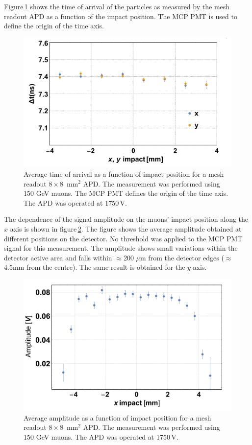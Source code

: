 \documentclass[review,number,sort&compress]{elsarticle}
\begin{document}
Figure\,\ref{fig:toa8x8impact} shows the time of arrival of the particles as measured by the mesh readout APD as a function of the impact position.
The MCP PMT is used to define the origin of the time axis.
\begin{figure}
  \centering
  \includegraphics[width = 0.6 \columnwidth]{toa8x8VsImpact}
  \caption{Average time of arrival as a function of impact position for a mesh readout $8 \times 8$~mm$^2$ APD. The measurement was performed using 150 GeV muons. The MCP PMT defines the origin of the time axis. The APD was operated at 1750\,V.}
  \label{fig:toa8x8impact}
\end{figure}

The dependence of the signal amplitude on the muons' impact position along the $x$ axis is shown in figure\,\ref{fig:ampli8x8impact}.
The figure shows the average amplitude obtained at different positions on the detector.
No threshold was applied to the MCP PMT signal for this measurement.
The amplitude shows small variations within the detector active area and falls within $\approx$200 $\mu$m from the detector edges ($\approx$4.5mm from the centre).
The same result is obtained for the $y$ axis.
\begin{figure}
  \centering
  \includegraphics[width = 0.6 \columnwidth]{ampli8x8vsImpact}
  \caption{Average amplitude as a function of impact position for a mesh readout $8 \times 8$~mm$^2$ APD. The measurement was performed using 150 GeV muons. The APD was operated at 1750\,V.}
  \label{fig:ampli8x8impact}
\end{figure}
\end{document}

